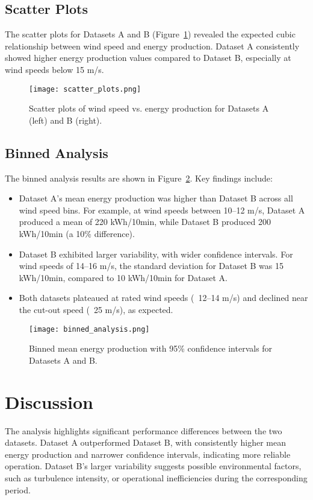 \documentclass[a4paper,11pt]{article}
\begin{document}
\subsection*{Scatter Plots}
The scatter plots for Datasets A and B (Figure~\ref{fig:scatter}) revealed the expected cubic relationship between wind speed and energy production. Dataset A consistently showed higher energy production values compared to Dataset B, especially at wind speeds below 15 m/s.

\begin{figure}[H]
    \centering
    \texttt{[image: scatter\_plots.png]} %
    \caption{Scatter plots of wind speed vs. energy production for Datasets A (left) and B (right).}
    \label{fig:scatter}
\end{figure}

\subsection*{Binned Analysis}
The binned analysis results are shown in Figure~\ref{fig:binned}. Key findings include:
\begin{itemize}
    \item Dataset A's mean energy production was higher than Dataset B across all wind speed bins. For example, at wind speeds between 10--12 m/s, Dataset A produced a mean of 220 kWh/10min, while Dataset B produced 200 kWh/10min (a 10\% difference).
    \item Dataset B exhibited larger variability, with wider confidence intervals. For wind speeds of 14--16 m/s, the standard deviation for Dataset B was 15 kWh/10min, compared to 10 kWh/10min for Dataset A.
    \item Both datasets plateaued at rated wind speeds (~12--14 m/s) and declined near the cut-out speed (~25 m/s), as expected.
\end{itemize}

\begin{figure}[H]
    \centering
    \texttt{[image: binned\_analysis.png]} %
    \caption{Binned mean energy production with 95\% confidence intervals for Datasets A and B.}
    \label{fig:binned}
\end{figure}

\section*{Discussion}
The analysis highlights significant performance differences between the two datasets. Dataset A outperformed Dataset B, with consistently higher mean energy production and narrower confidence intervals, indicating more reliable operation. Dataset B's larger variability suggests possible environmental factors, such as turbulence intensity, or operational inefficiencies during the corresponding period.
\end{document}
